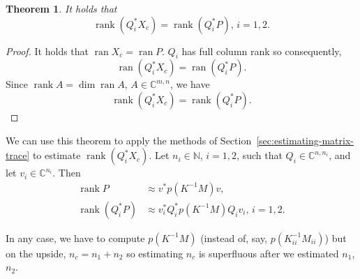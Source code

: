 \documentclass[%
	paper=a4,
	fontsize=10pt,
	DIV11,BCOR10mm,
	numbers=noenddot,
	abstract=yes
]{scrartcl}
\newcommand{\F}{\mathbb{C}}
\DeclareMathOperator{\ran}{ran}
\DeclareMathOperator{\rank}{rank}
\newtheorem{theorem}{Theorem}[section]
\theoremstyle{definition}
\begin{document}
\begin{theorem}
	It holds that
	\[ \rank(Q_i^* X_c) = \rank(Q_i^* P), \, i = 1, 2. \]
\end{theorem}

\begin{proof}
	It holds that $\ran X_c = \ran P$. $Q_i$ has full column rank so
	consequently,
	\[ \ran(Q_i^* X_c) = \ran(Q_i^* P). \]
	Since $\rank A = \dim \ran A$, $A \in \F^{m,n}$, we have
	\[ \rank(Q_i^* X_c) = \rank(Q_i^* P). \]
\end{proof}

We can use this theorem to apply the methods of
Section~\ref{sec:estimating-matrix-trace} to estimate $\rank(Q_i^* X_c)$. Let
$n_i \in \mathbb{N}$, $i = 1, 2$, such that $Q_i \in \F^{n,n_i}$, and let $v_i
\in \F^{n_i}$. Then
\begin{align*}
	\rank P &\approx v^* p(K^{-1} M) v, \\
	\rank(Q_i^* P) &\approx v_i^* Q_i^* p(K^{-1} M) Q_i v_i, \, i = 1, 2.
\end{align*}

In any case, we have to compute $p(K^{-1} M)$ (instead of, say, $p(K_{ii}^{-1}
M_{ii})$) but on the upside, $n_c = n_1 + n_2$ so estimating $n_c$ is
superfluous after we estimated $n_1$, $n_2$.

\printbibliography
\end{document}
